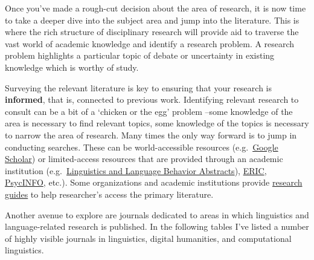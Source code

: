 \documentclass[
  letterpaper,
]{latex/krantz}
\begin{document}
Once you've made a rough-cut decision about the area of research, it is
now time to take a deeper dive into the subject area and jump into the
literature. This is where the rich structure of disciplinary research
will provide aid to traverse the vast world of academic knowledge and
identify a research problem. A research problem highlights a particular
topic of debate or uncertainty in existing knowledge which is worthy of
study.

Surveying the relevant literature is key to ensuring that your research
is \textbf{informed}, that is, connected to previous work. Identifying
relevant research to consult can be a bit of a `chicken or the egg'
problem --some knowledge of the area is necessary to find relevant
topics, some knowledge of the topics is necessary to narrow the area of
research. Many times the only way forward is to jump in conducting
searches. These can be world-accessible resources
(e.g.~\href{https://scholar.google.com/}{Google Scholar}) or
limited-access resources that are provided through an academic
institution
(e.g.~\href{https://about.proquest.com/en/products-services/llba-set-c}{Linguistics
and Language Behavior Abstracts}), \href{https://eric.ed.gov/}{ERIC},
\href{https://www.ebsco.com/products/research-databases/apa-psycinfo}{PsycINFO},
etc.). Some organizations and academic institutions provide
\href{https://guides.zsr.wfu.edu/linguistics}{research guides} to help
researcher's access the primary literature.

Another avenue to explore are journals dedicated to areas in which
linguistics and language-related research is published. In the following
tables I've listed a number of highly visible journals in linguistics,
digital humanities, and computational linguistics.
\end{document}
